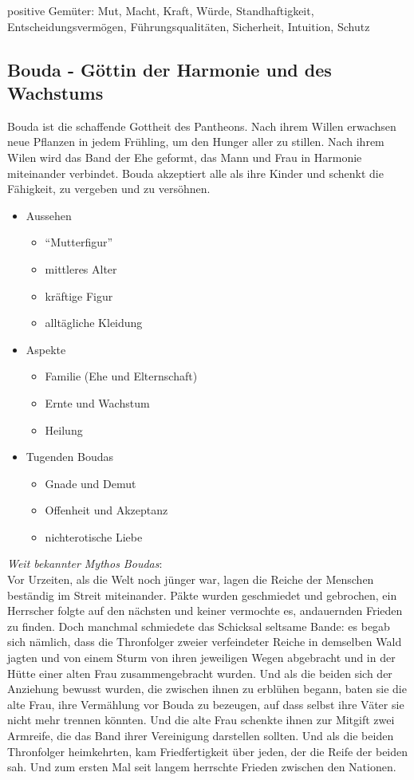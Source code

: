 positive Gemüter: Mut, Macht, Kraft, Würde, Standhaftigkeit, Entscheidungsvermögen, Führungsqualitäten, Sicherheit, Intuition, Schutz



\subsection{\textbf{Bouda} - Göttin der Harmonie und des Wachstums}
Bouda ist die schaffende Gottheit des Pantheons. Nach ihrem Willen erwachsen neue Pflanzen in jedem Frühling, um den Hunger aller zu stillen. Nach ihrem Wilen wird das Band 
der Ehe geformt, das Mann und Frau in Harmonie miteinander verbindet. Bouda akzeptiert alle als ihre Kinder und schenkt die Fähigkeit, zu vergeben und zu versöhnen.\\
\begin{itemize}
	\item Aussehen 
	\begin{itemize}
		\item ``Mutterfigur''
		\item mittleres Alter 
		\item kräftige Figur
		\item alltägliche Kleidung 
	\end{itemize}
	\item Aspekte
	\begin{itemize}
		\item Familie (Ehe und Elternschaft)
		\item Ernte und Wachstum
		\item Heilung
	\end{itemize}
	\item Tugenden Boudas
	\begin{itemize}
		\item Gnade und Demut
		\item Offenheit und Akzeptanz
		\item nichterotische Liebe
	\end{itemize}
\end{itemize}
\textit{Weit bekannter Mythos Boudas}:\\
Vor Urzeiten, als die Welt noch jünger war, lagen die Reiche der Menschen beständig im Streit miteinander. Päkte wurden geschmiedet und gebrochen, ein Herrscher folgte auf den 
nächsten und keiner vermochte es, andauernden Frieden zu finden. Doch manchmal schmiedete das Schicksal seltsame Bande: es begab sich nämlich, dass die Thronfolger zweier 
verfeindeter Reiche in demselben Wald jagten und von einem Sturm von ihren jeweiligen Wegen abgebracht und in der 
Hütte einer alten Frau zusammengebracht wurden. Und als die beiden sich der Anziehung bewusst wurden, die zwischen ihnen zu erblühen begann, baten sie die alte Frau, ihre
Vermählung vor Bouda zu bezeugen, auf dass selbst ihre Väter sie nicht mehr trennen könnten. Und die alte Frau schenkte ihnen zur Mitgift zwei Armreife, die das Band ihrer Vereinigung 
darstellen sollten. Und als die beiden Thronfolger heimkehrten, kam Friedfertigkeit über jeden, der die Reife der beiden sah. Und zum ersten Mal seit langem herrschte Frieden 
zwischen den Nationen.\\~\\

